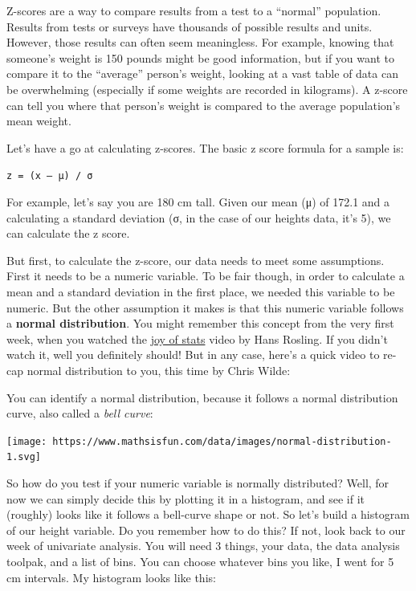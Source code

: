 \documentclass[]{book}
\theoremstyle{definition}
\theoremstyle{definition}
\theoremstyle{definition}
\theoremstyle{remark}
\begin{document}
Z-scores are a way to compare results from a test to a ``normal''
population. Results from tests or surveys have thousands of possible
results and units. However, those results can often seem meaningless.
For example, knowing that someone's weight is 150 pounds might be good
information, but if you want to compare it to the ``average'' person's
weight, looking at a vast table of data can be overwhelming (especially
if some weights are recorded in kilograms). A z-score can tell you where
that person's weight is compared to the average population's mean
weight.

Let's have a go at calculating z-scores. The basic z score formula for a
sample is:

\texttt{z\ =\ (x\ –\ μ)\ /\ σ}

For example, let's say you are 180 cm tall. Given our mean (μ) of 172.1
and a calculating a standard deviation (σ, in the case of our heights
data, it's 5), we can calculate the z score.

But first, to calculate the z-score, our data needs to meet some
assumptions. First it needs to be a numeric variable. To be fair though,
in order to calculate a mean and a standard deviation in the first
place, we needed this variable to be numeric. But the other assumption
it makes is that this numeric variable follows a \textbf{normal
distribution}. You might remember this concept from the very first week,
when you watched the
\href{http://www.gapminder.org/videos/the-joy-of-stats/}{joy of stats}
video by Hans Rosling. If you didn't watch it, well you definitely
should! But in any case, here's a quick video to re-cap normal
distribution to you, this time by Chris Wilde:

You can identify a normal distribution, because it follows a normal
distribution curve, also called a \emph{bell curve}:

\texttt{[image: https://www.mathsisfun.com/data/images/normal-distribution-1.svg]}

So how do you test if your numeric variable is normally distributed?
Well, for now we can simply decide this by plotting it in a histogram,
and see if it (roughly) looks like it follows a bell-curve shape or not.
So let's build a histogram of our height variable. Do you remember how
to do this? If not, look back to our week of univariate analysis. You
will need 3 things, your data, the data analysis toolpak, and a list of
bins. You can choose whatever bins you like, I went for 5 cm intervals.
My histogram looks like this:
\end{document}

